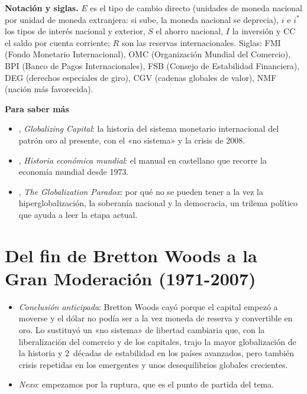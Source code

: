 \documentclass[11pt]{article}
\begin{document}
\begin{anotaciones}
\textbf{Notación y siglas.} $E$ es el tipo de cambio directo (unidades de moneda nacional por unidad de moneda extranjera: si sube, la moneda nacional se deprecia), $i$ e $i^*$ los tipos de interés nacional y exterior, $S$ el ahorro nacional, $I$ la inversión y CC el saldo por cuenta corriente; $R$ son las reservas internacionales. Siglas: FMI (Fondo Monetario Internacional), OMC (Organización Mundial del Comercio), BPI (Banco de Pagos Internacionales), FSB (Consejo de Estabilidad Financiera), DEG (derechos especiales de giro), CGV (cadenas globales de valor), NMF (nación más favorecida).
\end{anotaciones}

\begin{anotaciones}
\textbf{Para saber más}
\begin{itemize}
\item {}, \emph{Globalizing Capital}: la historia del sistema monetario internacional del patrón oro al presente, con el «no sistema» y la crisis de 2008\nocite{Eichengreen2019Globalizing}.
\item {}, \emph{Historia económica mundial}: el manual en castellano que recorre la economía mundial desde 1973\nocite{Comin2014Historia}.
\item {}, \emph{The Globalization Paradox}: por qué no se pueden tener a la vez la hiperglobalización, la soberanía nacional y la democracia, un trilema político que ayuda a leer la etapa actual\nocite{Rodrik2011Paradox}.
\end{itemize}
\end{anotaciones}

\section{Del fin de Bretton Woods a la Gran Moderación (1971-2007)}\label{sec:moderacion}

\begin{itemize}
\item \emph{Conclusión anticipada}: Bretton Woods cayó porque el capital empezó a moverse y el dólar no podía ser a la vez moneda de reserva y convertible en oro. Lo sustituyó un «no sistema» de libertad cambiaria que, con la liberalización del comercio y de los capitales, trajo la mayor globalización de la historia y 2~décadas de estabilidad en los países avanzados, pero también crisis repetidas en los emergentes y unos desequilibrios globales crecientes.
\item \emph{Nexo}: empezamos por la ruptura, que es el punto de partida del tema.
\end{itemize}
\end{document}
